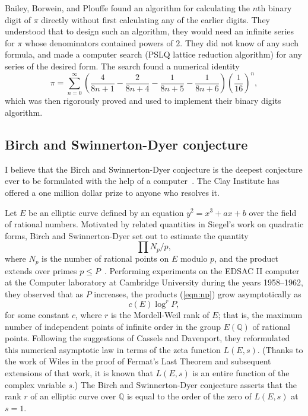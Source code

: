 \documentclass{llncs}
\newcommand{\ring}[1]{\mathbb{#1}}
\begin{document}

Bailey, Borwein, and Plouffe found an algorithm for calculating the
$n$th binary digit of $\pi$ directly without first calculating any of the
earlier digits.  They understood that to design such an algorithm,
they would need an infinite series for $\pi$ whose denominators
contained powers of $2$.  They did not know of any such formula, and
made a computer search (PSLQ lattice reduction algorithm) for any
series of the desired form.  The search found a numerical identity
\[
\pi = \sum_{n=0}^\infty 
\left(
\frac{4}{8n+1} - \frac{2}{8n+4} - \frac{1}{8n+5} - \frac{1}{8n+6}
\right) 
\left(\frac{1}{16}\right)^n,
\]
which was then rigorously proved and used to implement their binary
digits algorithm.



\subsection{Birch and Swinnerton-Dyer conjecture}

I believe that the Birch and Swinnerton-Dyer conjecture is the deepest
conjecture ever to be formulated with the help of a computer~\cite{BSD}.  The
Clay Institute has offered a one million dollar prize to anyone who
resolves it.

Let $E$  be an elliptic curve defined by
an equation $y^2 = x^3 + a x + b$ 
over the field of rational
numbers.  Motivated by related quantities in Siegel's work on quadratic forms, Birch and Swinnerton-Dyer set out to estimate the quantity
\begin{equation}\label{eqn:np}
\prod {N_p/p},
\end{equation}
where $N_p$ is the number of rational points on $E$ modulo $p$, and
the product extends over primes $p\le P$~\cite{Bir}.  Performing
experiments on the EDSAC II computer at the Computer laboratory at Cambridge University during the years 1958--1962, they observed that as $P$ increases, the products (\ref{eqn:np})
grow asymptotically as 
\[
c(E) \log^r P,
\]
for some constant $c$, where $r$ is the Mordell-Weil rank of $E$; that
is, the maximum number of independent points of infinite order in the
group $E(\ring{Q})$ of rational points.  Following the suggestions of
Cassels and Davenport, they reformulated this numerical asymptotic law in
terms of the zeta function $L(E,s)$.  (Thanks to the work of Wiles in
the proof of Fermat's Last Theorem and subsequent extensions of that
work, it is known that $L(E,s)$ is an entire function of the complex
variable $s$.)  The Birch and Swinnerton-Dyer conjecture asserts that
the rank $r$ of an elliptic curve over $\ring{Q}$ is equal to the
order of the zero of $L(E,s)$ at $s=1$.
\end{document}
